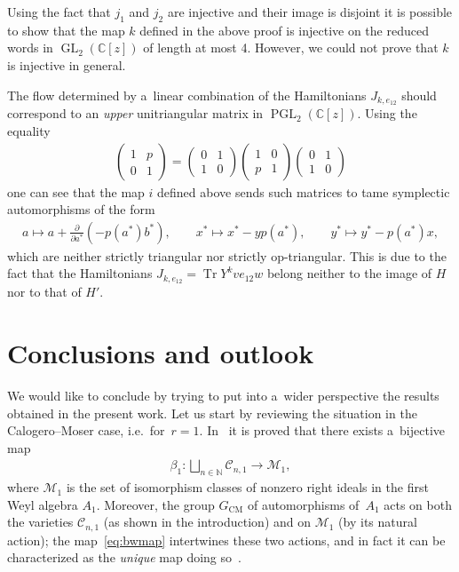 \documentclass[pdftex]{sigma}
\newcommand{\bb}[1]{\mathbb{#1}}
\newcommand{\app}[3]{#1\colon #2\to #3}
\DeclareMathOperator{\tr}{Tr}
\DeclareMathOperator{\GL}{GL}
\DeclareMathOperator{\PGL}{PGL}
\begin{document}
\begin{remark}
Using the fact that \(j_{1}\) and \(j_{2}\) are injective and their image is disjoint it is possible to
show that the map \(k\) def\/ined in the above proof is injective on the reduced words in
\(\GL_{2}(\bb{C}[z])\) of length at most 4.
However, we could not prove that \(k\) is injective in general.
\end{remark}
\begin{remark}
\label{rem:ot-h}
The f\/low determined by a~linear combination of the Hamiltonians \(J_{k,e_{12}}\) should correspond to an
\emph{upper} unitriangular matrix in \(\PGL_{2}(\bb{C}[z])\).
Using the equality
\begin{gather*}
\begin{pmatrix}
1&p
\\
0&1
\end{pmatrix}
=
\begin{pmatrix}
0&1
\\
1&0
\end{pmatrix}
\begin{pmatrix}
1&0
\\
p&1
\end{pmatrix}
\begin{pmatrix}
0&1
\\
1&0
\end{pmatrix}
\end{gather*}
one can see that the map \(i\) def\/ined above sends such matrices to tame symplectic automorphisms of the
form
\begin{gather*}
a\mapsto a+\frac{\partial}{\partial a^{*}}(-p(a^{*})b^{*}),
\qquad
x^{*}\mapsto x^{*}-yp(a^{*}),
\qquad
y^{*}\mapsto y^{*}-p(a^{*})x,
\end{gather*}
which are neither strictly triangular nor strictly op-triangular.
This is due to the fact that the Hamiltonians \(J_{k,e_{12}} = \tr Y^{k}ve_{12}w\) belong neither to the
image of \(H\) nor to that of \(H'\).
\end{remark}

\section{Conclusions and outlook}\label{concl}

We would like to conclude by trying to put into a~wider perspective the results obtained in the present
work.
Let us start by reviewing the situation in the Calogero--Moser case, i.e.\
for~\(r=1\).
In~\cite{bw00} it is proved that there exists a~bijective map
\begin{gather}
\label{eq:bwmap}
\app{\beta_{1}}{\bigsqcup_{n\in\bb{N}}\mathcal{C}_{n,1}}{\mathcal{M}_{1}},
\end{gather}
where \(\mathcal{M}_{1}\) is the set of isomorphism classes of nonzero right ideals in the f\/irst Weyl
algebra \(A_{1}\).
Moreover, the group \(G_{\mathrm{CM}}\) of automorphisms of~\(A_{1}\) acts on both the varieties
\(\mathcal{C}_{n,1}\) (as shown in the introduction) and on \(\mathcal{M}_{1}\) (by its natural action);
the map~\eqref{eq:bwmap} intertwines these two actions, and in fact it can be characterized as the
\emph{unique} map doing so~\cite{wils10}.
\end{document}
